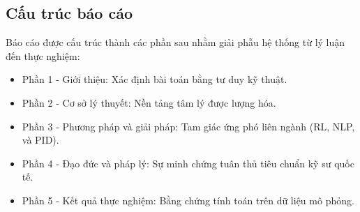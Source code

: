 \subsection{Cấu trúc báo cáo}

Báo cáo được cấu trúc thành các phần sau nhằm giải phẫu hệ thống từ lý luận đến thực nghiệm:
\begin{itemize}
    \item Phần 1 - Giới thiệu: Xác định bài toán bằng tư duy kỹ thuật.
    \item Phần 2 - Cơ sở lý thuyết: Nền tảng tâm lý được lượng hóa.
    \item Phần 3 - Phương pháp và giải pháp: Tam giác ứng phó liên ngành (RL, NLP, và PID).
    \item Phần 4 - Đạo đức và pháp lý: Sự minh chứng tuân thủ tiêu chuẩn kỹ sư quốc tế.
    \item Phần 5 - Kết quả thực nghiệm: Bằng chứng tính toán trên dữ liệu mô phỏng.
\end{itemize}
